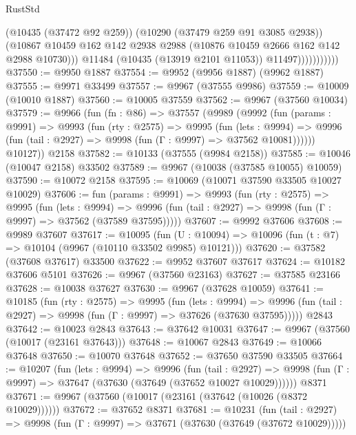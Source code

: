 \begin{lexlean}{RustStd}
\begin{coremodule}
                            (@10435 (@37472 @92 @259))
                            (@10290 (@37479 @259 @91 @3085 @2938))
                            (@10867
                              @10459
                              @162
                              @142
                              @2938
                              @2988
                              (@10876 @10459 @2666 @162 @142 @2988 @10730)))
                          @11484
                          (@10435 (@13919 @2101 @11053))
                          @11497)))))))))))
@37550 := @9950 @1887
@37554 := @9952 (@9956 @1887) (@9962 @1887)
@37555 := @9971 @33499
@37557 := @9967 (@37555 @9986)
@37559 := @10009 (@10010 @1887)
@37560 := @10005 @37559
@37562 := @9967 (@37560 @10034)
@37579 := @9966
    (fun (fn : @86) =>
    @37557
      (@9989
        (@9992
          (fun (params : @9991) =>
          @9993
            (fun (rty : @2575) =>
            @9995
              (fun (lets : @9994) =>
              @9996 (fun (tail : @2927) => @9998 (fun (Γ : @9997) => @37562 @10081))))))
        @10127))
    @2158
@37582 := @10133 (@37555 (@9984 @2158))
@37585 := @10046 (@10047 @2158) @33502
@37589 := @9967 (@10038 (@37585 @10055) @10059)
@37590 := @10072 @2158
@37595 := @10069 (@10071 @37590 @33505 @10027 @10029)
@37606 := fun (params : @9991) =>
  @9993
    (fun (rty : @2575) =>
    @9995
      (fun (lets : @9994) =>
      @9996 (fun (tail : @2927) => @9998 (fun (Γ : @9997) => @37562 (@37589 @37595)))))
@37607 := @9992 @37606
@37608 := @9989 @37607
@37617 := @10095
    (fun (U : @10094) => @10096 (fun (t : @7) => @10104 (@9967 (@10110 @33502 @9985) @10121)))
@37620 := @37582 (@37608 @37617) @33500
@37622 := @9952 @37607 @37617
@37624 := @10182 @37606 @5101
@37626 := @9967 (@37560 @23163)
@37627 := @37585 @23166
@37628 := @10038 @37627
@37630 := @9967 (@37628 @10059)
@37641 := @10185
    (fun (rty : @2575) =>
    @9995
      (fun (lets : @9994) =>
      @9996 (fun (tail : @2927) => @9998 (fun (Γ : @9997) => @37626 (@37630 @37595)))))
    @2843
@37642 := @10023 @2843
@37643 := @37642 @10031
@37647 := @9967 (@37560 (@10017 (@23161 @37643)))
@37648 := @10067 @2843
@37649 := @10066 @37648
@37650 := @10070 @37648
@37652 := @37650 @37590 @33505
@37664 := @10207
    (fun (lets : @9994) =>
    @9996
      (fun (tail : @2927) =>
      @9998 (fun (Γ : @9997) => @37647 (@37630 (@37649 (@37652 @10027 @10029))))))
    @8371
@37671 := @9967 (@37560 (@10017 (@23161 (@37642 (@10026 (@8372 @10029))))))
@37672 := @37652 @8371
@37681 := @10231
    (fun (tail : @2927) => @9998 (fun (Γ : @9997) => @37671 (@37630 (@37649 (@37672 @10029)))))

\end{coremodule}
\end{lexlean}
